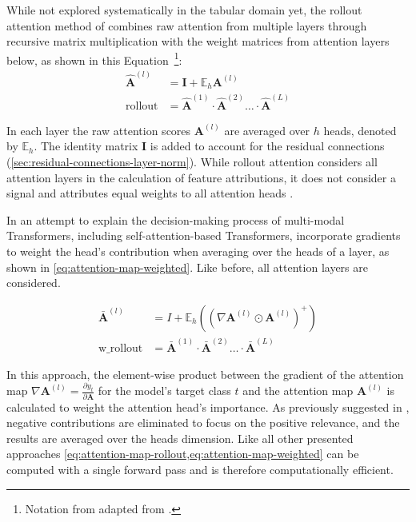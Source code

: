 While not explored systematically in the tabular domain yet, the rollout attention method of \textcite[][3]{abnarQuantifyingAttentionFlow2020} combines raw attention from multiple layers through recursive matrix multiplication with the weight matrices from attention layers below, as shown in this Equation~\footnote{Notation from adapted from \textcite[][786]{cheferTransformerInterpretabilityAttention2021}.}:
\begin{equation}
\begin{aligned}
\hat{\boldsymbol{A}}^{(l)} & =\boldsymbol{I}+\mathbb{E}_h \boldsymbol{A}^{(l)}\\
\operatorname { rollout }& =\hat{\boldsymbol{A}}^{(1)} \cdot \hat{\boldsymbol{A}}^{(2)} \ldots\cdot\hat{\boldsymbol{A}}^{(L)}
\end{aligned}
\label{eq:attention-map-rollout}
\end{equation}

In each layer the raw attention scores $\boldsymbol{A}^{(l)}$ are averaged over $h$ heads, denoted by $\mathbb{E}_h$. The identity matrix $\boldsymbol{I}$ is added to account for the residual connections (\cref{sec:residual-connections-layer-norm}). While rollout attention considers all attention layers in the calculation of feature attributions, it does not consider a signal and attributes equal weights to all attention heads \autocite[][786]{cheferTransformerInterpretabilityAttention2021}.

In an attempt to explain the decision-making process of multi-modal Transformers, including self-attention-based Transformers, \textcite[][3]{cheferTransformerInterpretabilityAttention2021} incorporate gradients to weight the head's contribution when averaging over the heads of a layer, as shown in \cref{eq:attention-map-weighted}. Like before, all attention layers are considered.

\begin{equation}
\begin{aligned}
\bar{\boldsymbol{A}}^{(l)} & =I+ \mathbb{E}_h\left(\left(\nabla \boldsymbol{A}^{(l)} \odot \boldsymbol{A}^{(l)}\right)^{+}\right) \\
\operatorname {w\_rollout} & =\bar{\boldsymbol{A}}^{(1)} \cdot \bar{\boldsymbol{A}}^{(2)} \ldots \cdot \bar{\boldsymbol{A}}^{(L)}
\end{aligned}
\label{eq:attention-map-weighted}
\end{equation}

In this approach, the element-wise product between the gradient of the attention map $\nabla \boldsymbol{A}^{(l)}=\frac{\partial y_t}{\partial \boldsymbol{A}}$ for the model's target class $t$ and the attention map $\boldsymbol{A}^{(l)}$ is calculated to weight the attention head's importance. As previously suggested in \textcite[][786]{cheferTransformerInterpretabilityAttention2021}, negative contributions are eliminated to focus on the positive relevance, and the results are averaged over the heads dimension. Like all other presented approaches \cref{eq:attention-map-rollout,eq:attention-map-weighted} can be computed with a single forward pass and is therefore computationally efficient.

